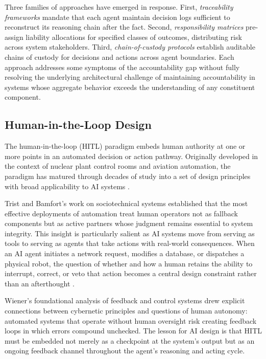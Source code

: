 Three families of approaches have emerged in response. First, \emph{traceability frameworks} mandate that each agent maintain decision logs sufficient to reconstruct its reasoning chain after the fact. Second, \emph{responsibility matrices} pre-assign liability allocations for specified classes of outcomes, distributing risk across system stakeholders. Third, \emph{chain-of-custody protocols} establish auditable chains of custody for decisions and actions across agent boundaries. Each approach addresses some symptoms of the accountability gap without fully resolving the underlying architectural challenge of maintaining accountability in systems whose aggregate behavior exceeds the understanding of any constituent component.

\subsection{Human-in-the-Loop Design}

The human-in-the-loop (HITL) paradigm embeds human authority at one or more points in an automated decision or action pathway. Originally developed in the context of nuclear plant control rooms and aviation automation, the paradigm has matured through decades of study into a set of design principles with broad applicability to AI systems \cite{tristr81}.

Trist and Bamfort's work on sociotechnical systems established that the most effective deployments of automation treat human operators not as fallback components but as active partners whose judgment remains essential to system integrity. This insight is particularly salient as AI systems move from serving as tools to serving as agents that take actions with real-world consequences. When an AI agent initiates a network request, modifies a database, or dispatches a physical robot, the question of whether and how a human retains the ability to interrupt, correct, or veto that action becomes a central design constraint rather than an afterthought \cite{wiener1948}.

Wiener's foundational analysis of feedback and control systems drew explicit connections between cybernetic principles and questions of human autonomy: automated systems that operate without human oversight risk creating feedback loops in which errors compound unchecked. The lesson for AI design is that HITL must be embedded not merely as a checkpoint at the system's output but as an ongoing feedback channel throughout the agent's reasoning and acting cycle.

